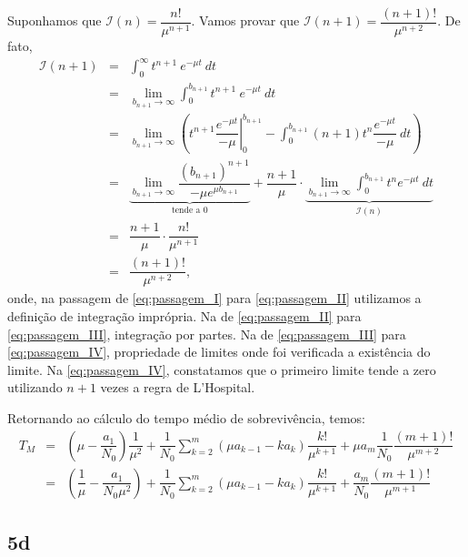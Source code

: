 {Suponhamos que \(\mathcal{I}(n) = \dfrac{n!}{\mu^{n+1}}\). Vamos provar que \(\mathcal{I}(n+1) = \dfrac{(n+1)!}{\mu^{n+2}}\). De fato,
\begin{eqnarray}
\label{eq:passagem_I}
\mathcal{I}(n+1)
&=& \displaystyle\int_{0}^{\infty} t^{n+1}\ e^{-\mu t}\ dt \\
\label{eq:passagem_II}
&=& \displaystyle\lim_{b_{n+1} \to \infty}\int_{0}^{b_{n+1}} t^{n+1}\ e^{-\mu t}\ dt \\
\label{eq:passagem_III}
&=& 
\displaystyle\lim_{b_{n+1} \to \infty} \left(\left.t^{n+1} \dfrac{e^{-\mu t}}{-\mu}\right|_{0}^{b_{n+1}} - \int_{0}^{b_{n+1}} (n+1) t^{n} \dfrac{e^{-\mu t}}{-\mu}\ dt\right) \\
\label{eq:passagem_IV}
&=& 
\underbrace{\displaystyle\lim_{b_{n+1} \to \infty}  \dfrac{(b_{n+1})^{n+1}}{-\mu e^{\mu b_{n+1}}}}_{\mbox{tende a } 0}
+
\dfrac{n+1}{\mu} \cdot
\underbrace{\lim_{b_{n+1} \to \infty} \int_{0}^{b_{n+1}} t^{n} e^{-\mu t}\ dt}_{\mathcal{I}(n)} \\
\label{eq:passagem_V}
&=& \dfrac{n+1}{\mu} \cdot \dfrac{n!}{\mu^{n+1}} \\
\label{eq:passagem_VI}
&=& \dfrac{(n+1)!}{\mu^{n+2}},
\end{eqnarray}
onde, na passagem de \eqref{eq:passagem_I} para \eqref{eq:passagem_II} utilizamos a definição de integração imprópria. Na de \eqref{eq:passagem_II} para \eqref{eq:passagem_III}, integração por partes. Na de \eqref{eq:passagem_III} para \eqref{eq:passagem_IV}, propriedade de limites onde foi verificada a existência do limite. Na \eqref{eq:passagem_IV}, constatamos que o primeiro limite tende a zero utilizando \(n+1\) vezes a regra de L'Hospital.

Retornando ao cálculo do tempo médio de sobrevivência, temos:
\begin{eqnarray}
\nonumber
T_M
&=& 
\left(\mu -\dfrac{a_1}{N_0}\right) \dfrac{1}{\mu^2} +
\dfrac{1}{N_0} \displaystyle\sum_{k=2}^{m} (\mu a_{k-1}-k a_{k}) \dfrac{k!}{\mu^{k+1}} +
\mu a_m \dfrac{1}{N_0} \dfrac{(m+1)!}{\mu^{m+2}} \\
&=& 
\left(\dfrac{1}{\mu} -\dfrac{a_1}{N_0\mu^2}\right) +
\dfrac{1}{N_0} \displaystyle\sum_{k=2}^{m} (\mu a_{k-1}-k a_{k}) \dfrac{k!}{\mu^{k+1}} + \dfrac{a_m}{N_0} \dfrac{(m+1)!}{\mu^{m+1}}
\end{eqnarray}





\subsection*{5d}

}
